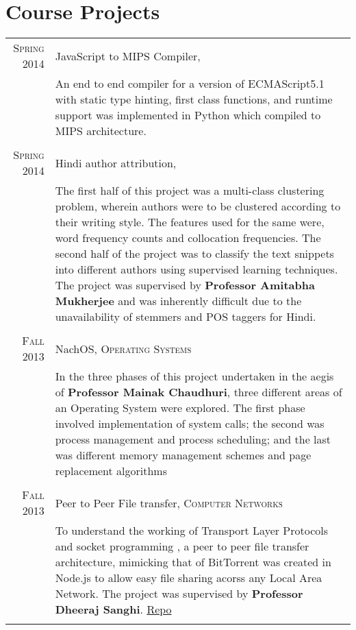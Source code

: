\documentclass[a4paper,10pt]{article} %
\begin{document}
\section{Course Projects}

\begin{tabular}{r|p{11cm}}

    \textsc{Spring 2014} & JavaScript to MIPS Compiler, \textsc{\raggedright Compilers} \\
        & \footnotesize{An end to end compiler for a version of ECMAScript5.1 with static type hinting,
            first class functions, and runtime support was implemented in Python which compiled to MIPS
            architecture.}\\
            \\

    \textsc{Spring 2014} & Hindi author attribution, \textsc{\raggedright Artificial Intelligence} \\
        & \footnotesize{The first half of this project was a multi-class clustering problem, wherein authors were to be clustered
            according to their writing style. The features used for the same were, word frequency counts and collocation frequencies.
            The second half of the project was to classify the text snippets into different authors using supervised learning techniques.
            The project was supervised by \textbf{Professor Amitabha Mukherjee} and was inherently difficult due to the unavailability
            of stemmers and POS taggers for Hindi.} \\
            \\

    \textsc{Fall 2013} & NachOS, \textsc{Operating Systems} \\
        & \footnotesize{In the three phases of this project undertaken in the aegis of \textbf{Professor Mainak Chaudhuri},
            three different areas of an Operating System were explored.
            The first phase involved implementation of system calls; the second was process management and process scheduling;
            and the last was different memory management schemes and page replacement algorithms }\\
            \\

    \textsc{Fall 2013} & Peer to Peer File transfer, \textsc{Computer Networks} \\
        & \footnotesize{To understand the working of Transport Layer Protocols and socket programming
            , a peer to peer file transfer architecture,
            mimicking that of BitTorrent was created in Node.js to allow easy file sharing acorss any Local Area Network.
            The project was supervised by \textbf{Professor Dheeraj Sanghi}. \href{https://github.com/srijanshetty/nodesock} {Repo}}\\
            \\


\end{tabular}
\end{document}

